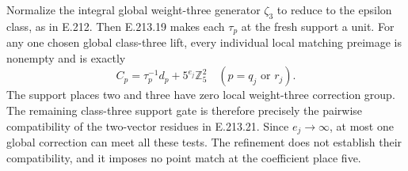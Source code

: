 Normalize the integral global weight-three
generator $\zeta_3$ to reduce to the epsilon
class, as in E.212. Then E.213.19 makes each
$\tau_p$ at the fresh support a unit. For any
one chosen global class-three lift, every
individual local matching preimage is nonempty
and is exactly
\[
 C_p=\tau_p^{-1}d_p+
            5^{e_j}\mathbb Z_5^2
 \quad(p=q_j\text{ or }r_j).
 \tag{E.213.21}
\]
The support places two and three have zero
local weight-three correction group.
The remaining class-three support gate is
therefore precisely the pairwise compatibility
of the two-vector residues in E.213.21.
Since $e_j\longrightarrow\infty$, at most one
global correction can meet all these tests.
The refinement does not establish their
compatibility, and it imposes no point match
at the coefficient place five.
